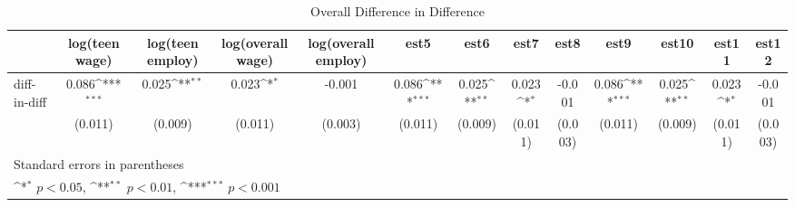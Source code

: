 \begin{table}[htbp]\centering
\def\sym#1{\ifmmode^{#1}\else\(^{#1}\)\fi}
\caption{Overall Difference in Difference\label{auto}}
\begin{tabular}{l*{12}{c}}
\hline\hline
            &log(teen wage)         &log(teen employ)         &log(overall wage)         &log(overall employ)         &        est5         &        est6         &        est7         &        est8         &        est9         &       est10         &       est11         &       est12         \\
\hline
diff-in-diff&       0.086\sym{***}&       0.025\sym{**} &       0.023\sym{*}  &      -0.001         &       0.086\sym{***}&       0.025\sym{**} &       0.023\sym{*}  &      -0.001         &       0.086\sym{***}&       0.025\sym{**} &       0.023\sym{*}  &      -0.001         \\
            &     (0.011)         &     (0.009)         &     (0.011)         &     (0.003)         &     (0.011)         &     (0.009)         &     (0.011)         &     (0.003)         &     (0.011)         &     (0.009)         &     (0.011)         &     (0.003)         \\
\hline\hline
\multicolumn{13}{l}{\footnotesize Standard errors in parentheses}\\
\multicolumn{13}{l}{\footnotesize \sym{*} \(p<0.05\), \sym{**} \(p<0.01\), \sym{***} \(p<0.001\)}\\
\end{tabular}
\end{table}
